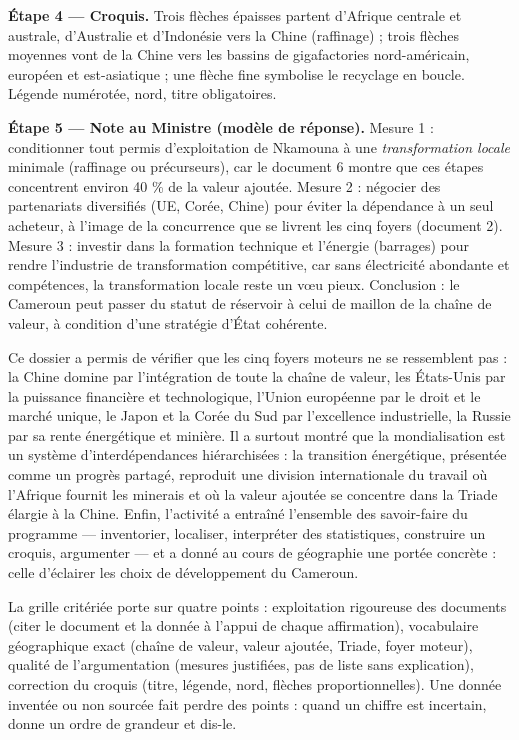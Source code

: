 \documentclass[11pt]{article}
\newcommand{\cle}[1]{{\popxbold\color{popdark}#1}}
\newcounter{popsec}
\newcounter{popsub}
\newcommand{\courssub}[1]{%
  \stepcounter{popsub}%
  \par\vspace{9pt}\noindent{\popxbold\fontsize{11.5}{13}\selectfont\color{popink}{\color{poporange}\thepopsec.\thepopsub}\hspace{6pt}#1}\par\nopagebreak\vspace{4pt}
}
\begin{document}
\begin{exoresolu}
\textbf{Étape 4 — Croquis.} Trois flèches épaisses partent d'Afrique centrale et australe, d'Australie et d'Indonésie vers la Chine (raffinage) ; trois flèches moyennes vont de la Chine vers les bassins de gigafactories nord-américain, européen et est-asiatique ; une flèche fine symbolise le recyclage en boucle. Légende numérotée, nord, titre obligatoires.

\textbf{Étape 5 — Note au Ministre (modèle de réponse).} Mesure 1 : conditionner tout permis d'exploitation de Nkamouna à une \emph{transformation locale} minimale (raffinage ou précurseurs), car le document 6 montre que ces étapes concentrent environ 40 \% de la valeur ajoutée. Mesure 2 : négocier des partenariats diversifiés (UE, Corée, Chine) pour éviter la dépendance à un seul acheteur, à l'image de la concurrence que se livrent les cinq foyers (document 2). Mesure 3 : investir dans la formation technique et l'énergie (barrages) pour rendre l'industrie de transformation compétitive, car sans électricité abondante et compétences, la transformation locale reste un vœu pieux. Conclusion : le Cameroun peut passer du statut de réservoir à celui de maillon de la chaîne de valeur, à condition d'une stratégie d'État cohérente.
\end{exoresolu}

\courssub{Bilan de l'activité}

Ce dossier a permis de vérifier que les cinq foyers moteurs ne se ressemblent pas : la Chine domine par l'intégration de toute la chaîne de valeur, les États-Unis par la puissance financière et technologique, l'Union européenne par le droit et le marché unique, le Japon et la Corée du Sud par l'excellence industrielle, la Russie par sa rente énergétique et minière. Il a surtout montré que la \cle{mondialisation} est un système d'interdépendances hiérarchisées : la transition énergétique, présentée comme un progrès partagé, reproduit une division internationale du travail où l'Afrique fournit les minerais et où la valeur ajoutée se concentre dans la Triade élargie à la Chine. Enfin, l'activité a entraîné l'ensemble des savoir-faire du programme — inventorier, localiser, interpréter des statistiques, construire un croquis, argumenter — et a donné au cours de géographie une portée concrète : celle d'éclairer les choix de développement du Cameroun.

\begin{attention}
La grille critériée porte sur quatre points : exploitation rigoureuse des documents (citer le document et la donnée à l'appui de chaque affirmation), vocabulaire géographique exact (chaîne de valeur, valeur ajoutée, Triade, foyer moteur), qualité de l'argumentation (mesures justifiées, pas de liste sans explication), correction du croquis (titre, légende, nord, flèches proportionnelles). Une donnée inventée ou non sourcée fait perdre des points : quand un chiffre est incertain, donne un ordre de grandeur et dis-le.
\end{attention}
\end{document}
